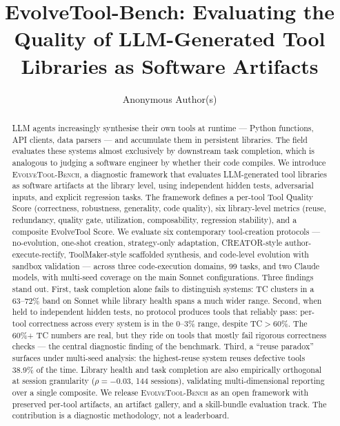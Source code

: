 \documentclass[sigconf,anonymous,review,natbib=false]{acmart}
\begin{document}
\title{EvolveTool-Bench: Evaluating the Quality of LLM-Generated Tool Libraries as Software Artifacts}

\author{Anonymous Author(s)}

\begin{abstract}
LLM agents increasingly synthesise their own tools at runtime --- Python functions, API clients, data parsers --- and accumulate them in persistent libraries. The field evaluates these systems almost exclusively by downstream task completion, which is analogous to judging a software engineer by whether their code compiles. We introduce \textsc{EvolveTool-Bench}, a diagnostic framework that evaluates LLM-generated tool libraries as software artifacts at the library level, using independent hidden tests, adversarial inputs, and explicit regression tasks. The framework defines a per-tool Tool Quality Score (correctness, robustness, generality, code quality), six library-level metrics (reuse, redundancy, quality gate, utilization, composability, regression stability), and a composite EvolveTool Score. We evaluate six contemporary tool-creation protocols --- no-evolution, one-shot creation, strategy-only adaptation, CREATOR-style author-execute-rectify, ToolMaker-style scaffolded synthesis, and code-level evolution with sandbox validation --- across three code-execution domains, 99 tasks, and two Claude models, with multi-seed coverage on the main Sonnet configurations. Three findings stand out. First, task completion alone fails to distinguish systems: TC clusters in a 63--72\% band on Sonnet while library health spans a much wider range. Second, when held to independent hidden tests, no protocol produces tools that reliably pass: per-tool correctness across every system is in the 0--3\% range, despite TC$>$60\%. The 60\%+ TC numbers are real, but they ride on tools that mostly fail rigorous correctness checks --- the central diagnostic finding of the benchmark. Third, a ``reuse paradox'' surfaces under multi-seed analysis: the highest-reuse system reuses defective tools 38.9\% of the time. Library health and task completion are also empirically orthogonal at session granularity ($\rho{=}-0.03$, 144 sessions), validating multi-dimensional reporting over a single composite. We release \textsc{EvolveTool-Bench} as an open framework with preserved per-tool artifacts, an artifact gallery, and a skill-bundle evaluation track. The contribution is a diagnostic methodology, not a leaderboard.
\end{abstract}
\end{document}
